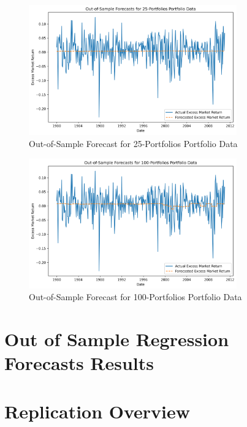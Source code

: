 \documentclass[12pt]{article}
\begin{document}
\begin{figure}[h]
    \centering
    \includegraphics[width=0.8\textwidth]{plots/Out_of_Sample_Forecasts_for_25_Portfolios_Portfolio_Data.png}
    \caption{Out-of-Sample Forecast for 25-Portfolios Portfolio Data}
    \label{fig:forecast_chart}
\end{figure}

\begin{figure}[h]
    \centering
    \includegraphics[width=0.8\textwidth]{plots/Out_of_Sample_Forecasts_for_100_Portfolios_Portfolio_Data.png}
    \caption{Out-of-Sample Forecast for 100-Portfolios Portfolio Data}
    \label{fig:forecast_chart}
\end{figure}

\doublespacing
\section{Out of Sample Regression Forecasts Results}



\doublespacing
\section{Replication Overview}
\end{document}
